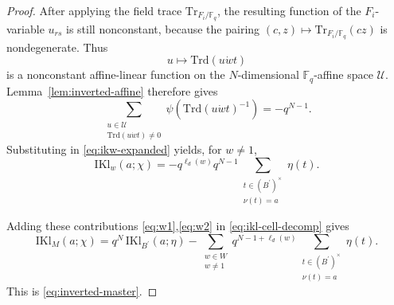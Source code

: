 \documentclass[11pt]{amsart}
\newcommand{\IKl}{\mathrm{IKl}}
\newcommand{\Trd}{\mathrm{Trd}}
\newcommand{\Trace}{\mathrm{Tr}}
\numberwithin{equation}{section}
\theoremstyle{remark}
\theoremstyle{plain}
\theoremstyle{definition}
\begin{document}
\begin{proof}
After applying the field trace
\(\Trace_{F_i/\mathbb{F}_q}\), the resulting function of the
\(F_i\)-variable \(u_{rs}\) is still nonconstant, because the pairing
\((c,z)\mapsto \Trace_{F_i/\mathbb{F}_q}(cz)\) is nondegenerate.  Thus
\[
u\longmapsto \Trd(u\dot w t)
\]
is a nonconstant affine-linear function on the \(N\)-dimensional
\(\mathbb{F}_q\)-affine space \(\mathcal{U}\).  Lemma~\ref{lem:inverted-affine}
therefore gives
\[
\sum_{\substack{u\in \mathcal{U}\\ \Trd(u\dot w t)\neq 0}}
\psi(\Trd(u\dot w t)^{-1})
=
-q^{N-1}.
\]
Substituting in \eqref{eq:ikw-expanded} yields, for \(w\neq 1\),
\begin{equation}
\label{eq:w2}
\IKl_w(a;\chi)
=
-q^{\ell_d(w)}q^{N-1}
\sum_{\substack{t\in (B^{\prime})^\times\\ \nu(t)=a}}\eta(t).
\end{equation}

Adding these contributions \eqref{eq:w1},\eqref{eq:w2} in
\eqref{eq:ikl-cell-decomp} gives
\[
\IKl_M(a;\chi)
= q^N \, \IKl_{B^{\prime}}(a;\eta)
- \sum_{\substack{w\in W\\w\neq 1}} q^{N-1+\ell_d(w)}
\sum_{\substack{t\in (B^{\prime})^\times \\ \nu(t)=a}}\eta(t).
\]
This is \eqref{eq:inverted-master}.
\end{proof}
\end{document}
